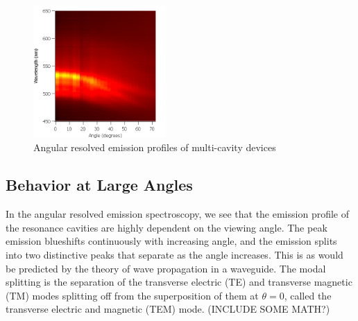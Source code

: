 \documentclass{report}
\begin{document}
\begin{figure}[h]
            \includegraphics[width=0.45\textwidth]{images/n5_heatmap.png}
            \caption{Angular resolved emission profiles of multi-cavity devices}
		\end{figure}
    
        \subsection{Behavior at Large Angles}
		In the angular resolved emission spectroscopy, we see that the emission profile of the resonance cavities are highly dependent on the viewing angle. The peak emission blueshifts continuously with increasing angle, and the emission splits into two distinctive peaks that separate as the angle increases. This is as would be predicted by the theory of wave propagation in a waveguide. The modal splitting is the separation of the transverse electric (TE) and transverse magnetic (TM) modes splitting off from the superposition of them at $\theta=0$, called the transverse electric and magnetic (TEM) mode. (INCLUDE SOME MATH?)

    
\end{document}
